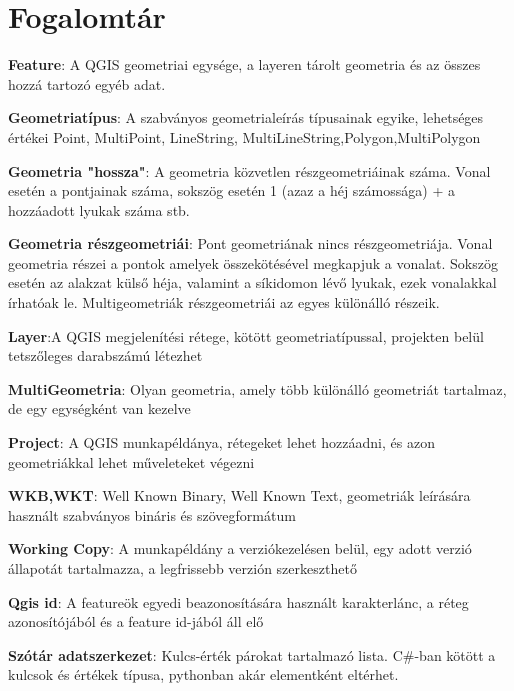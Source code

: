 \section{Fogalomtár}
\begin{definition}
	\label{def:1}
	\textbf{Feature}: A QGIS geometriai egysége, a layeren tárolt geometria és az összes hozzá tartozó egyéb adat.
\end{definition}
\begin{definition}
	\label{def:2}
	\textbf{Geometriatípus}: A szabványos geometrialeírás típusainak egyike, lehetséges értékei Point, MultiPoint, LineString, MultiLineString,Polygon,MultiPolygon
\end{definition}
\begin{definition}
	\label{def:3}
	\textbf{Geometria "hossza"}: A geometria közvetlen részgeometriáinak száma. Vonal esetén a pontjainak száma, sokszög esetén 1 (azaz a héj számossága) + a hozzáadott lyukak száma stb.
\end{definition}
\begin{definition}
	\label{def:4}
	\textbf{Geometria részgeometriái}: Pont geometriának nincs részgeometriája. Vonal geometria részei a pontok amelyek összekötésével megkapjuk a vonalat. Sokszög esetén az alakzat külső héja, valamint a síkidomon lévő lyukak, ezek vonalakkal írhatóak le. Multigeometriák részgeometriái az egyes különálló részeik.
\end{definition}
\begin{definition}
	\label{def:5}
	\textbf{Layer}:A QGIS megjelenítési rétege, kötött geometriatípussal, projekten belül tetszőleges darabszámú létezhet
\end{definition}
\begin{definition}
	\label{def:6}
	\textbf{MultiGeometria}: Olyan geometria, amely több különálló geometriát tartalmaz, de egy egységként van kezelve
\end{definition}
\begin{definition}
	\label{def:7}
	\textbf{Project}: A QGIS munkapéldánya, rétegeket lehet hozzáadni, és azon geometriákkal lehet műveleteket végezni
\end{definition}
\begin{definition}
	\label{def:8}
	\textbf{WKB,WKT}: Well Known Binary, Well Known Text, geometriák leírására használt szabványos bináris és szövegformátum
\end{definition}
\begin{definition}
	\label{def:9}
	\textbf{Working Copy}: A munkapéldány a verziókezelésen belül, egy adott verzió állapotát tartalmazza, a legfrissebb verzión szerkeszthető
\end{definition}
\begin{definition}
	\label{def:10}
	\textbf{Qgis id}: A featureök egyedi beazonosítására használt karakterlánc, a réteg azonosítójából és a feature id-jából áll elő
\end{definition}
\begin{definition}
	\label{def:11}
	\textbf{Szótár adatszerkezet}: Kulcs-érték párokat tartalmazó lista. C\#-ban kötött a kulcsok és értékek típusa, pythonban akár elementként eltérhet.
\end{definition}